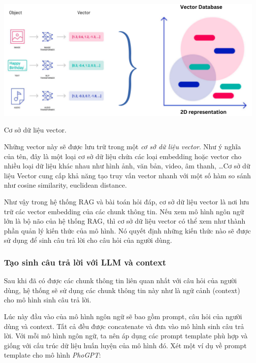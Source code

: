 \documentclass[a4paper, 12pt, openany]{book}
\begin{document}
\begin{minipage}{\linewidth}
    \centering
    \includegraphics[width=\linewidth]{./assets/images/vectordb.png}
    \captionsetup{type=figure}
    \caption{Cơ sở dữ liệu vector.}
\end{minipage}

Những vector này sẽ được lưu trữ trong một \textit{cơ sở dữ liệu vector}. Như ý nghĩa của tên, đây là một loại cơ sở dữ liệu chứa các loại embedding hoặc vector cho nhiều loại dữ liệu khác nhau
như hình ảnh, văn bản, video, âm thanh, \dots Cơ sở dữ liệu Vector cung cấp khả năng tạo truy vấn vector nhanh với một số 
hàm so sánh như cosine similarity, euclidean distance.

Như vậy trong hệ thống RAG và bài toán hỏi đáp, cơ sở dữ liệu vector là nơi lưu trữ các vector embedding của các chunk thông tin.
Nếu xem mô hình ngôn ngữ lớn là bộ não của hệ thống RAG, thì cơ sở dữ liệu vector có thể xem như thành phần quản lý kiến thức của mô hình.
Nó quyết định những kiến thức nào sẽ được sử dụng để sinh câu trả lời cho câu hỏi của người dùng.
    

\subsubsection{Tạo sinh câu trả lời với LLM và context}

Sau khi đã có được các chunk thông tin liên quan nhất với câu hỏi của người dùng, hệ thống sẽ sử dụng các chunk thông tin này như là ngữ cảnh (context) cho mô hình sinh câu trả lời.

Lúc này đầu vào của mô hình ngôn ngữ sẽ bao gồm prompt, câu hỏi của người dùng và context. Tất cả đều được concatenate và đưa vào mô hình sinh câu trả lời.
Với mỗi mô hình ngôn ngữ, ta nên áp dụng các prompt template phù hợp và giống với cấu trúc dữ liệu huấn luyện của mô hình đó. Xét một ví dụ về prompt template cho mô hình \textit{PhoGPT}:
\end{document}
